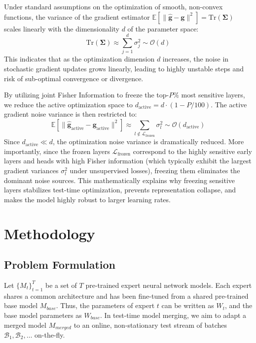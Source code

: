 \documentclass{article}
\theoremstyle{plain}
\theoremstyle{definition}
\theoremstyle{remark}
\begin{document}
Under standard assumptions on the optimization of smooth, non-convex functions, the variance of the gradient estimator $\mathbb{E}[\|\hat{\mathbf{g}} - \mathbf{g}\|^2] = \text{Tr}(\mathbf{\Sigma})$ scales linearly with the dimensionality $d$ of the parameter space:
\begin{equation}
\text{Tr}(\mathbf{\Sigma}) \approx \sum_{j=1}^d \sigma_j^2 \sim \mathcal{O}(d)
\end{equation}
This indicates that as the optimization dimension $d$ increases, the noise in stochastic gradient updates grows linearly, leading to highly unstable steps and risk of sub-optimal convergence or divergence.

By utilizing joint Fisher Information to freeze the top-$P\%$ most sensitive layers, we reduce the active optimization space to $d_{\text{active}} = d \cdot (1 - P/100)$. The active gradient noise variance is then restricted to:
\begin{equation}
\mathbb{E}[\|\hat{\mathbf{g}}_{\text{active}} - \mathbf{g}_{\text{active}}\|^2] \approx \sum_{l \notin \mathcal{L}_{\text{frozen}}} \sigma_l^2 \sim \mathcal{O}(d_{\text{active}})
\end{equation}
Since $d_{\text{active}} \ll d$, the optimization noise variance is dramatically reduced. More importantly, since the frozen layers $\mathcal{L}_{\text{frozen}}$ correspond to the highly sensitive early layers and heads with high Fisher information (which typically exhibit the largest gradient variances $\sigma_l^2$ under unsupervised losses), freezing them eliminates the dominant noise sources. This mathematically explains why freezing sensitive layers stabilizes test-time optimization, prevents representation collapse, and makes the model highly robust to larger learning rates.

\section{Methodology}
\label{submission:method}

\subsection{Problem Formulation}
Let $\{M_t\}_{t=1}^T$ be a set of $T$ pre-trained expert neural network models. Each expert shares a common architecture and has been fine-tuned from a shared pre-trained base model $M_{base}$. Thus, the parameters of expert $t$ can be written as $W_t$, and the base model parameters as $W_{base}$. In test-time model merging, we aim to adapt a merged model $M_{merged}$ to an online, non-stationary test stream of batches $\mathcal{B}_1, \mathcal{B}_2, \dots$ on-the-fly.
\end{document}
